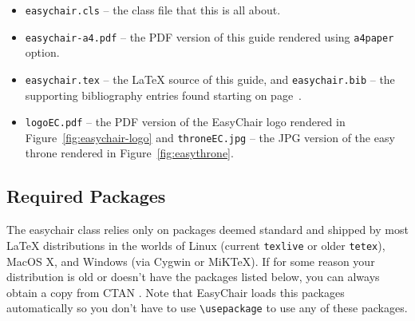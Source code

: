 \documentclass{easychair}
\newcommand{\easychair}{\textsf{easychair}}
\newcommand{\miktex}{MiK{\TeX}}
\begin{document}
\begin{itemize}
\item
\texttt{easychair.cls} -- the class file that this is all about.

\item
\texttt{easychair-a4.pdf} -- the PDF version of this guide rendered using 
\texttt{a4paper} option.

\item
\texttt{easychair.tex} -- the {\LaTeX} source of this guide, 
and
\texttt{easychair.bib} -- the supporting bibliography entries found starting 
on page~\pageref{sect:bib}.

\item
\texttt{logoEC.pdf} -- the PDF version of the EasyChair logo rendered in
Figure~\ref{fig:easychair-logo} and
\texttt{throneEC.jpg} -- the JPG version of the easy throne rendered in 
Figure~\ref{fig:easythrone}.

\end{itemize}

\subsection{Required Packages}

The {\easychair} class relies only on packages deemed standard and shipped by
most {\LaTeX} distributions in the worlds of Linux (current \texttt{texlive} \cite{texlive}
or older \texttt{tetex}), MacOS X,
and Windows (via Cygwin or {\miktex}).
If for some reason your distribution is old or doesn't have the packages
listed below, you can always obtain a copy from CTAN \cite{ctan}. Note
that EasyChair loads this packages automatically so you don't have to
use \verb|\usepackage| to use any of these packages.
\end{document}
